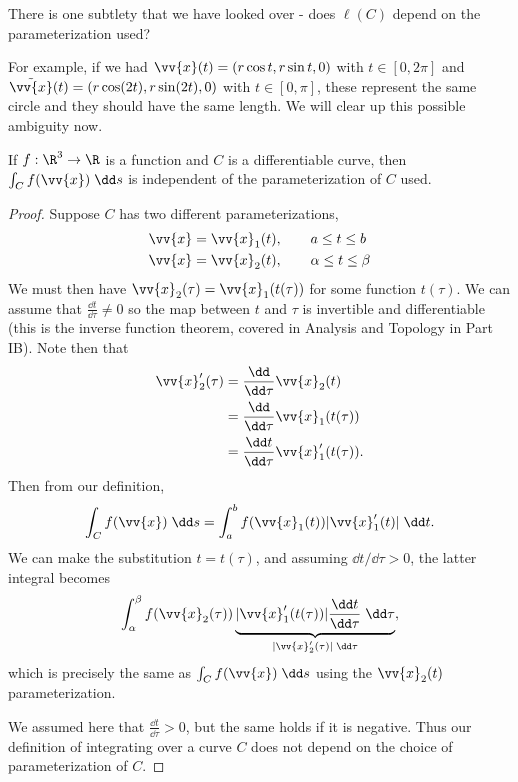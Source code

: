 There is one subtlety that we have looked over - does $\ell(C)$ depend on the parameterization used?

For example, if we had $\vv{x}(t) = (r \cos t, r \sin t, 0)$ with $t \in [0, 2 \pi]$ and $\tilde{\vv{x}}(t) = (r \cos(2 t), r \sin(2 t), 0)$ with $t \in [0, \pi]$, these represent the same circle and they should have the same length. We will clear up this possible ambiguity now.

\begin{proposition}
	If $f:\R^3 \rightarrow \R$ is a function and $C$ is a differentiable curve, then $\int_C f(\vv{x}) \; \dd s$ is independent of the parameterization of $C$ used.
\end{proposition}
\begin{proof}
Suppose $C$ has two different parameterizations,
\begin{align*}
	\vv{x} &= \vv{x}_1(t), \quad \quad a \leq t \leq b \\
	\vv{x} &= \vv{x}_2(t), \quad \quad \alpha \leq t \leq \beta
\end{align*}
We must then have $\vv{x}_2(\tau) = \vv{x}_1(t(\tau))$ for some function $t(\tau)$. We can assume that $\frac{\dd t}{\dd \tau} \neq 0$ so the map between $t$ and $\tau$ is invertible and differentiable (this is the inverse function theorem, covered in Analysis and Topology in Part IB). Note then that 
\begin{align*}
	\vv{x}'_2(\tau) &= \frac{\dd}{\dd\tau} \vv{x}_2(t) \\
	&= \frac{\dd} {\dd \tau} \vv{x}_1(t(\tau)) \\
	&= \frac{\dd t}{\dd \tau} \vv{x}_1'(t(\tau)).
\end{align*}
Then from our definition,
$$
\int_C f(\vv{x}) \; \dd s = \int_{a}^b f(\vv{x}_1(t)) |\vv{x}_1'(t)| \; \dd t.
$$
We can make the substitution $t = t(\tau)$, and assuming $\dd t/\dd\tau > 0$, the latter integral becomes
$$
\int_\alpha^\beta f(\vv{x}_2(\tau)) \underbrace{|\vv{x}_1'(t(\tau))| \frac{\dd t}{\dd \tau} \;\dd \tau}_{|\vv{x}'_2 (\tau)| \; \dd\tau},
$$
which is precisely the same as $\int_C f(\vv{x}) \; \dd s$ using the $\vv{x}_2(t)$ parameterization. 

We assumed here that $\frac{\dd t}{\dd \tau} > 0$, but the same holds if it is negative. Thus our definition of integrating over a curve $C$ does not depend on the choice of parameterization of $C$.
\end{proof}

